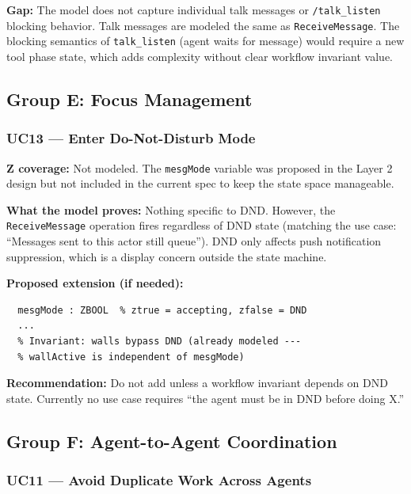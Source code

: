 \documentclass[a4paper,10pt,fleqn]{article}
\begin{document}
\textbf{Gap:} The model does not capture individual talk messages or
\texttt{/talk\_listen} blocking behavior. Talk messages are modeled the
same as \texttt{ReceiveMessage}. The blocking semantics of
\texttt{talk\_listen} (agent waits for message) would require a new tool
phase state, which adds complexity without clear workflow invariant value.

\subsection{Group E: Focus Management}

\subsubsection{UC13 --- Enter Do-Not-Disturb Mode}

\textbf{Z coverage:} Not modeled. The \texttt{mesgMode} variable was
proposed in the Layer 2 design but not included in the current spec to
keep the state space manageable.

\textbf{What the model proves:} Nothing specific to DND. However, the
\texttt{ReceiveMessage} operation fires regardless of DND state (matching
the use case: ``Messages sent to this actor still queue''). DND only
affects push notification suppression, which is a display concern outside
the state machine.

\textbf{Proposed extension (if needed):}

\begin{verbatim}
  mesgMode : ZBOOL  % ztrue = accepting, zfalse = DND
  ...
  % Invariant: walls bypass DND (already modeled ---
  % wallActive is independent of mesgMode)
\end{verbatim}

\textbf{Recommendation:} Do not add unless a workflow invariant depends
on DND state. Currently no use case requires ``the agent must be in
DND before doing X.''

\subsection{Group F: Agent-to-Agent Coordination}

\subsubsection{UC11 --- Avoid Duplicate Work Across Agents}
\end{document}
